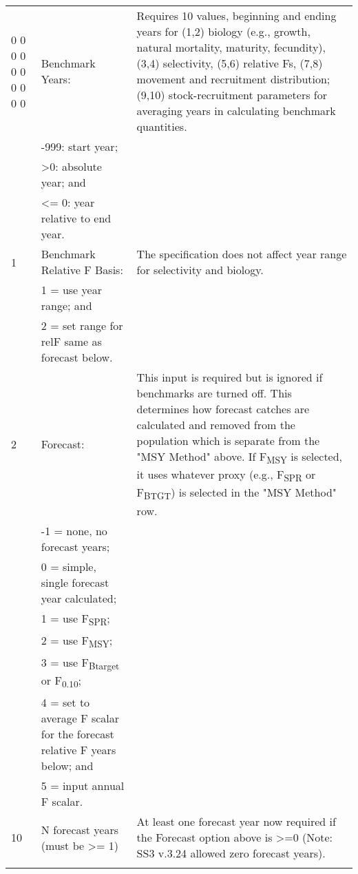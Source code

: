 \begin{landscape}
{\begin{longtable}{p{3.2cm} p{7cm} p{10.8cm}}
  
 \hline
 0 0 0 0 0 0 0 0 0 0 & Benchmark Years: & \multirow{1}{1cm}[-0.25cm]{\parbox{11cm }{ Requires 10 values, beginning and ending years for (1,2) biology (e.g., growth, natural mortality, maturity, fecundity), (3,4) selectivity, (5,6) relative Fs, (7,8) movement and recruitment distribution; (9,10) stock-recruitment parameters for averaging years in calculating benchmark quantities.}} \Tstrut\\
  & -999: start year; & \\
  & >0:   absolute year; and & \\
  & <= 0: year relative to end year. & \\


  1 & Benchmark Relative F Basis: &  \multirow{1}{1cm}[-0.25cm]{\parbox{11cm }{ The specification does not affect year range for selectivity and biology.}} \Tstrut\\
    & 1 = use year range; and & \\
    & 2 = set range for relF same as forecast below. & \\
    
  \hline
  2 & Forecast: & \multirow{1}{1cm}[-0.25cm]{\parbox{11cm }{ This input is required but is ignored if benchmarks are turned off.  This determines how forecast catches are calculated and removed from the population which is separate from the "MSY Method" above. If F\textsubscript{MSY} is selected, it uses whatever proxy (e.g., F\textsubscript{SPR} or F\textsubscript{BTGT}) is selected in the "MSY Method" row.}} \Tstrut\\
    & -1 = none, no forecast years; & \\
    & 0 = simple, single forecast year calculated; & \\
    & 1 = use F\textsubscript{SPR}; & \\
    & 2 = use F\textsubscript{MSY}; & \\
    & 3 = use F\textsubscript{Btarget} or F\textsubscript{0.10}; & \\
    & 4 = set to average F scalar for the forecast relative F years below; and & \\
    & 5 = input annual F scalar. & \Bstrut\\
    
  \hline
  10 & N forecast years (must be >= 1) &  \multirow{1}{1cm}[-0.25cm]{\parbox{11cm }{ At least one forecast year now required if the Forecast option above is >=0 (Note: SS3 v.3.24 allowed zero forecast years).}} \Tstrut\\
     & & \Bstrut\\
     

\end{longtable}}
\end{landscape}
